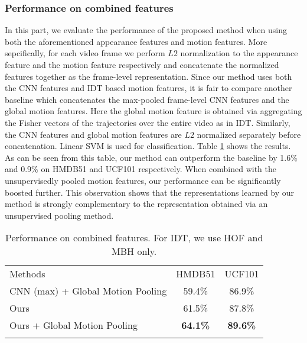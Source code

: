 \documentclass[journal]{IEEEtran}
\begin{document}
\subsubsection{Performance on combined features}
In this part, we evaluate the performance of the proposed method when using both the aforementioned appearance features and motion features. More sepcifically, for each video frame we perform $L2$ normalization to the appearance feature and the motion feature respectively and concatenate the normalized features together as the frame-level representation. Since our method uses both the CNN features and IDT based motion features, it is fair to compare another baseline which concatenates the max-pooled frame-level CNN features and the global motion features. Here the global motion feature is obtained via aggregating the Fisher vectors of the trajectories over the entire video as in IDT\cite{Wang2013}.
Similarly, the CNN features and global motion features are $L2$ normalized separately before concatenation. Linear SVM is used for classification. Table \ref{tab:combined} shows the results. As can be seen from this table, our method can outperform the baseline by 1.6\% and 0.9\% on HMDB51 and UCF101 respectively. When combined with the unsupervisedly pooled motion features, our performance can be significantly boosted further. This observation shows that the representations learned by our method is strongly complementary to the representation obtained via an unsupervised pooling method.


\begin{table}[htbp]\normalsize
 \caption{Performance on combined features. For IDT, we use HOF and MBH only.}
        \centering

        \begin{tabular}{lcc}

            \hline\noalign{\smallskip}

                Methods  &    HMDB51  & UCF101 \\

            \noalign{\smallskip}

            \hline

            \noalign{\smallskip}

             CNN (max) + Global Motion Pooling   & 59.4\%          &   86.9\%                \\

             Ours             &  61.5\%         &	  87.8\%				\\
			 Ours + Global Motion Pooling  & \textbf{64.1\%} & \textbf{89.6\%} \\

            \noalign{\smallskip}

            \hline \noalign{\smallskip}

      \end{tabular}

      \label{tab:combined}

\end{table}
\end{document}
